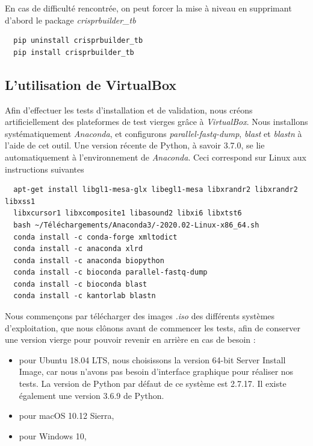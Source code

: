 \documentclass[twoside,a4paper,11pt,frenchb,openany]{report}
\begin{document}
En cas de difficulté rencontrée, on peut forcer la mise à niveau en supprimant d'abord le package \textit{crisprbuilder\_tb}
\begin{verbatim}
  pip uninstall crisprbuilder_tb
  pip install crisprbuilder_tb
\end{verbatim}





\subsection{L'utilisation de VirtualBox}

Afin d'effectuer les tests d'installation et de validation, nous créons artificiellement des plateformes de test vierges grâce à \textit{VirtualBox}. Nous installons systématiquement \textit{Anaconda}, et configurons \textit{parallel-fastq-dump}, \textit{blast} et \textit{blastn} à l'aide de cet outil. Une version récente de Python, à savoir 3.7.0, se lie automatiquement à l'environnement de \textit{Anaconda}. Ceci correspond sur Linux aux instructions suivantes

\begin{verbatim}
  apt-get install libgl1-mesa-glx libegl1-mesa libxrandr2 libxrandr2 libxss1 
  libxcursor1 libxcomposite1 libasound2 libxi6 libxtst6
  bash ~/Téléchargements/Anaconda3/-2020.02-Linux-x86_64.sh
  conda install -c conda-forge xmltodict
  conda install -c anaconda xlrd
  conda install -c anaconda biopython
  conda install -c bioconda parallel-fastq-dump
  conda install -c bioconda blast
  conda install -c kantorlab blastn
\end{verbatim}

Nous commençons par télécharger des images \textit{.iso} des différents systèmes d'exploitation, que nous clônons avant de commencer les tests, afin de conserver une version vierge pour pouvoir revenir en arrière en cas de besoin :
\begin{itemize}
\item pour Ubuntu 18.04 LTS, nous choisissons la version 64-bit Server Install Image, car nous n'avons pas besoin d'interface graphique pour réaliser nos tests. La version de Python par défaut de ce système est 2.7.17. Il existe également une version 3.6.9 de Python.
\item pour macOS 10.12 Sierra, 
\item pour Windows 10, 
\end{itemize}
\end{document}
